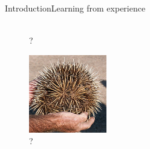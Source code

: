 \begin{frame}{Introduction}{Learning from experience}
\begin{figure}[ht]
\begin{minipage}[b]{0.20\linewidth}
\\?
\end{minipage}
\hspace{0.1cm}
\begin{minipage}[b]{0.20\linewidth}
\centering
\includegraphics[width=\textwidth]{img/introduction/echidna.png}
\\?
\end{minipage}

\end{figure}
\end{frame}

